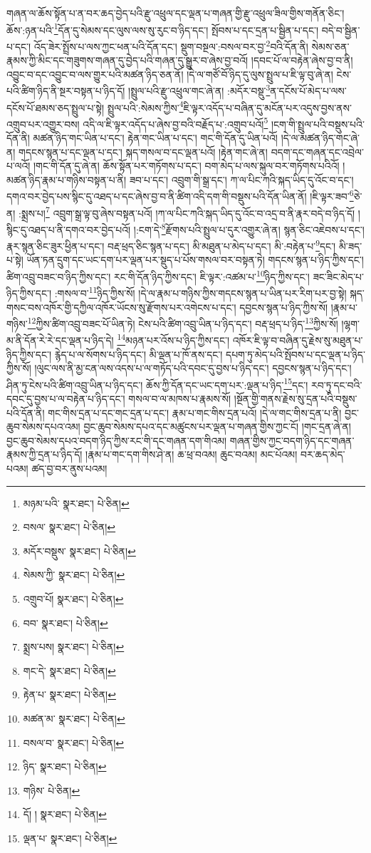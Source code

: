གཞན་ལ་ཆོས་སྟོན་པ་ན་བར་ཆད་བྱེད་པའི་རྫུ་འཕྲུལ་དང་ལྡན་པ་གཞན་གྱི་རྫུ་འཕྲུལ་ཟིལ་གྱིས་གནོན་ཅིང་། ཆོས་:ཉན་པའི་\footnote{མཉམ་པའི་  སྣར་ཐང་།  པེ་ཅིན། }དོན་དུ་སེམས་དང་ལུས་ལས་སུ་རུང་བ་ཉིད་དང་། སྤོབས་པ་དང་དྲན་པ་སྦྱིན་པ་དང་། བདེ་བ་སྦྱིན་པ་དང་། འོད་ཟེར་སྤྲོས་པ་ལས་ཀྱང་ཕན་པའི་དོན་དང་། སྡུག་བསྔལ་:བསལ་བར་བྱ་\footnote{བསལ་  སྣར་ཐང་།  པེ་ཅིན། }བའི་དོན་ནི། སེམས་ཅན་རྣམས་ཀྱི་མིང་དང་གཟུགས་གཞན་དུ་བྱེད་པའི་གཞན་དུ་སྒྱུར་བ་ཞེས་བྱ་བའོ། །དབང་པོ་ལ་བརྟེན་ཞེས་བྱ་བ་ནི། འབྱུང་བ་དང་འབྱུང་བ་ལས་གྱུར་པའི་མཚན་ཉིད་ཅན་ནོ། །དེ་ལ་གཙོ་བོ་ཉིད་དུ་ལུས་སྤྲུལ་པ་ཇི་ལྟ་བུ་ཞེ་ན། ངེས་པའི་ཚིག་ཉིད་ནི་སྔར་བསྟན་པ་ཉིད་དོ། །སྤྲུལ་པའི་རྫུ་འཕྲུལ་གང་ཞེ་ན། :མདོར་བསྡུ་\footnote{མདོར་བསྡུས་  སྣར་ཐང་།  པེ་ཅིན། }ན་དངོས་པོ་མེད་པ་ལས་དངོས་པོ་ཐམས་ཅད་སྤྲུལ་པ་སྟེ། སྤྲུལ་པའི་:སེམས་ཀྱིས་\footnote{སེམས་ཀྱི་  སྣར་ཐང་།  པེ་ཅིན། }ཇི་ལྟར་འདོད་པ་བཞིན་དུ་མངོན་པར་འདུས་བྱས་ནས་འགྲུབ་པར་འགྱུར་བས། འདི་ལ་ཇི་ལྟར་འདོད་པ་ཞེས་བྱ་བའི་བརྗོད་པ་:འགྲུབ་པའོ།\footnote{འགྲུབ་པོ།  སྣར་ཐང་།  པེ་ཅིན། } །ངག་གི་སྤྲུལ་པའི་བསྡུས་པའི་དོན་ནི། མཚན་ཉིད་གང་ཡིན་པ་དང་། རྟེན་གང་ཡིན་པ་དང་། གང་གི་དོན་དུ་ཡིན་པའོ། །དེ་ལ་མཚན་ཉིད་གང་ཞེ་ན། གདངས་སྙན་པ་དང་ལྡན་པ་དང་། སྐད་གསལ་བ་དང་ལྡན་པའོ། །རྟེན་གང་ཞེ་ན། བདག་དང་གཞན་དང་འབྲེལ་པ་ལའོ། །གང་གི་དོན་དུ་ཞེ་ན། ཆོས་སྟོན་པར་གཏོགས་པ་དང་། བག་མེད་པ་ལས་སྐུལ་བར་གཏོགས་པའིའོ། །མཚན་ཉིད་རྣམ་པ་གཉིས་བསྟན་པ་ནི། ཟབ་པ་དང་། འབྲུག་གི་སྒྲ་དང་། ཀ་ལ་པིང་ཀའི་སྐད་ཡིད་དུ་འོང་བ་དང་། དགའ་བར་བྱེད་པས་སྙིང་དུ་འཐད་པ་དང་ཞེས་བྱ་བ་ནི་ཚིག་འདི་དག་གི་བསྡུས་པའི་དོན་ཡིན་ནོ། །ཇི་ལྟར་ཟབ་\footnote{བབ་  སྣར་ཐང་།  པེ་ཅིན། }ཅེ་ན། :སྨྲས་པ།\footnote{སྨྲས་པས།  སྣར་ཐང་།  པེ་ཅིན། } འབྲུག་སྒྲ་ལྟ་བུ་ཞེས་བསྟན་པའོ། །ཀ་ལ་པིང་ཀའི་སྐད་ཡིད་དུ་འོང་བ་འདྲ་བ་ནི་རྣར་བདེ་བ་ཉིད་དོ། །སྙིང་དུ་འཐད་པ་ནི་དགའ་བར་བྱེད་པའོ། །:ངག་དེ་\footnote{གང་དེ་  སྣར་ཐང་།  པེ་ཅིན། }རྫོགས་པའི་སྤྲུལ་པ་དུར་འགྱུར་ཞེ་ན། སྙན་ཅིང་འཇེབས་པ་དང་། རྣར་སྙན་ཅིང་ཟུར་ཕྱིན་པ་དང་། བརྡ་ཕྲད་ཅིང་སྙན་པ་དང་། མི་མཐུན་པ་མེད་པ་དང་། མི་:བརྟེན་པ་\footnote{རྟེན་པ་  སྣར་ཐང་།  པེ་ཅིན། }དང་། མི་ཟད་པ་སྟེ། ཡོན་ཏན་དྲུག་དང་ཡང་དག་པར་ལྡན་པར་སྡུད་པ་པོས་གསལ་བར་བསྟན་ཏེ། གདངས་སྙན་པ་ཉིད་ཀྱིས་དང་། ཚིག་འབྲུ་བཟང་བ་ཉིད་ཀྱིས་དང་། རང་གི་དོན་ཉིད་ཀྱིས་དང་། ཇི་ལྟར་:འཚམ་པ་\footnote{མཚན་མ་  སྣར་ཐང་།  པེ་ཅིན། }ཉིད་ཀྱིས་དང་། ཟང་ཟིང་མེད་པ་ཉིད་ཀྱིས་དང་། :གསལ་བ་\footnote{བསལ་བ་  སྣར་ཐང་།  པེ་ཅིན། }ཉིད་ཀྱིས་སོ། །དེ་ལ་རྣམ་པ་གཉིས་ཀྱིས་གདངས་སྙན་པ་ཡིན་པར་རིག་པར་བྱ་སྟེ། སྐད་གསང་བས་འཁོར་གྱི་དཀྱིལ་འཁོར་ཡོངས་སུ་རྫོགས་པར་འགེངས་པ་དང་། དབྱངས་སྙན་པ་ཉིད་ཀྱིས་སོ། །རྣམ་པ་གཉིས་\footnote{ཉིད་  སྣར་ཐང་།  པེ་ཅིན། }ཀྱིས་ཚིག་འབྲུ་བཟང་པོ་ཡིན་ཏེ། ངེས་པའི་ཚིག་འབྲུ་ཡིན་པ་ཉིད་དང་། བརྡ་ཕྲད་པ་ཉིད་\footnote{གཉིས་  པེ་ཅིན། }ཀྱིས་སོ། །ལྷག་མ་ནི་དོན་རེ་རེ་དང་ལྡན་པ་ཉིད་དེ། \footnote{དོ། །   སྣར་ཐང་།  པེ་ཅིན། }མཉན་པར་འོས་པ་ཉིད་ཀྱིས་དང་། འཁོར་ཇི་ལྟ་བ་བཞིན་དུ་རྗེས་སུ་མཐུན་པ་ཉིད་ཀྱིས་དང་། རྙེད་པ་ལ་སོགས་པ་ཉིད་དང་། མི་ལྡན་པ་ཁོ་ནས་དང་། དཔག་ཏུ་མེད་པའི་སྤོབས་པ་དང་ལྡན་པ་ཉིད་ཀྱིས་སོ། །ལུང་ལས་ནི་མྱ་ངན་ལས་འདས་པ་ལ་གཏོད་པའི་དབང་དུ་བྱས་པ་ཉིད་དང་། དབྱངས་སྙན་པ་ཉིད་དང་། ཤིན་ཏུ་ངེས་པའི་ཚིག་འབྲུ་ཡིན་པ་ཉིད་དང་། ཆོས་ཀྱི་དོན་དང་ཡང་དག་པར་:ལྡན་པ་ཉིད་\footnote{ལྡན་པ་  སྣར་ཐང་།  པེ་ཅིན། }དང་། རབ་ཏུ་དང་བའི་དབང་དུ་བྱས་པ་ལ་བརྟེན་པ་ཉིད་དང་། གསལ་བ་ལ་མཁས་པ་རྣམས་སོ། །སྔོན་གྱི་གནས་རྗེས་སུ་དྲན་པའི་བསྡུས་པའི་དོན་ནི། གང་གིས་དྲན་པ་དང་གང་དྲན་པ་དང་། རྣམ་པ་གང་གིས་དྲན་པའོ། །དེ་ལ་གང་གིས་དྲན་པ་ནི། བྱང་ཆུབ་སེམས་དཔའ་འམ། བྱང་ཆུབ་སེམས་དཔའ་དང་མཚུངས་པར་ལྡན་པ་གཞན་གྱིས་ཀྱང་ངོ། །གང་དྲན་ཞེ་ན། བྱང་ཆུབ་སེམས་དཔའ་བདག་ཉིད་ཀྱིས་རང་གི་དང་གཞན་དག་གིའམ། གཞན་གྱིས་ཀྱང་བདག་ཉིད་དང་གཞན་རྣམས་ཀྱི་དྲན་པ་ཉིད་དོ། །རྣམ་པ་གང་དག་གིས་ཤེ་ན། ཆ་ཕྲ་བའམ། ཆུང་བའམ། མང་པོའམ། བར་ཆད་མེད་པའམ། ཚད་བྱ་བར་ནུས་པའམ། 